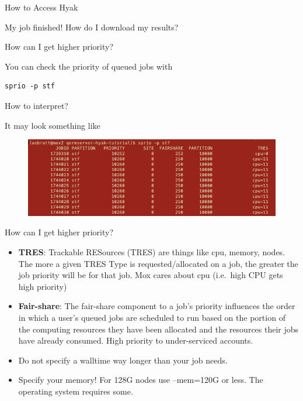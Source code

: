 \documentclass[ignorenonframetext,]{beamer}
\begin{document}
\begin{frame}[fragile]{How to Access Hyak}
\begin{block}{My job finished! How do I download my results?}
\end{block}

\begin{block}{How can I get higher priority?}

You can check the priority of queued jobs with

\begin{verbatim}
sprio -p stf
\end{verbatim}

How to interpret?

It may look something like

\begin{figure}
\centering
\includegraphics[width=6.25000in]{images/Hyak_priority.png}
\caption{}
\end{figure}

\end{block}

\begin{block}{How can I get higher priority?}

\begin{itemize}[<+->]
\item
  \textbf{TRES}: Trackable RESources (TRES) are things like cpu, memory,
  nodes. The more a given TRES Type is requested/allocated on a job, the
  greater the job priority will be for that job. Mox cares about cpu
  (i.e.~high CPU gets high priority)
\item
  \textbf{Fair-share}: The fair-share component to a job's priority
  influences the order in which a user's queued jobs are scheduled to
  run based on the portion of the computing resources they have been
  allocated and the resources their jobs have already consumed. High
  priority to under-serviced accounts.
\item
  Do not specify a walltime way longer than your job needs.
\item
  Specify your memory! For 128G nodes use --mem=120G or less. The
  operating system requires some.
\end{itemize}

\end{block}


\end{frame}
\end{document}
